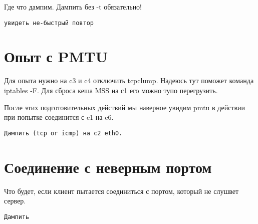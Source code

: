 \documentclass[a4paper,12pt]{article}
\begin{document}
Где что дампим. Дампить без -t обязательно!

\begin{Verbatim}
увидеть не-быстрый повтор
\end{Verbatim}

\section{Опыт с PMTU}

Для опыта нужно на c3 и c4 отключить tcpclump.
Надеюсь тут поможет команда iptables -F.
Для сброса кеша MSS на с1 его можно тупо перегрузить.

После этих подготовительных действий мы наверное увидим pmtu в действии при попытке соединится с c1 на c6.

\begin{Verbatim}
Дампить (tcp or icmp) на c2 eth0.
\end{Verbatim}

\section{Соединение с неверным портом}

Что будет, если клиент пытается соединиться с портом, который не слушвет сервер.

\begin{Verbatim}
Дампить
\end{Verbatim}
\end{document}
